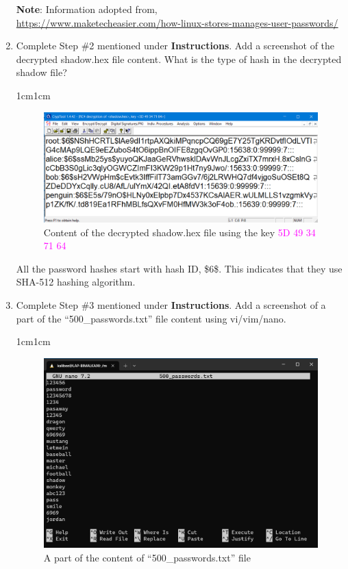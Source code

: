 \documentclass[11pt,letterpaper]{article}
\newenvironment{answer}{\em \color{blue} \begin{adjustwidth}{1cm}{1cm}}{\end{adjustwidth}}
\begin{document}
\begin{enumerate}
		\textbf{Note}: Information adopted from,  \\\url{https://www.maketecheasier.com/how-linux-stores-manages-user-passwords/}
		
		\item Complete Step \#2 mentioned under \textbf{Instructions}. Add a screenshot of the decrypted shadow.hex file content. What is the type of hash in the decrypted shadow file?
		
		\begin{answer}
			\begin{figure}[h]
				\centering
				\includegraphics[width=0.7\columnwidth]{images/shdwdecrypt}
				\caption{Content of the decrypted shadow.hex file using the key \textcolor{magenta}{5D 49 34 71 64}} \label{fig:shadow.hex}
			\end{figure}
		
		All the password hashes start with hash ID, \$6\$. This indicates that they use SHA-512 hashing algorithm.
		
		\end{answer}
		
		\item Complete Step \#3 mentioned under \textbf{Instructions}. Add a screenshot of a part of the ``500\_passwords.txt'' file content using vi/vim/nano.
		
		\begin{answer}
			\begin{figure}[h]
				\centering
				\includegraphics[width=0.7\columnwidth]{images/dict_500}
				\caption{A part of the content of ``500\_passwords.txt'' file} \label{fig:dict_500}
			\end{figure}
		\end{answer}
		

\end{enumerate}
\end{document}
